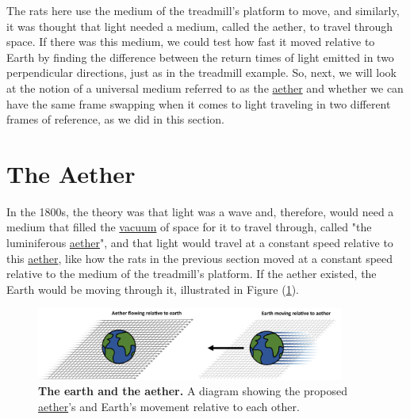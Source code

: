 The rats here use the medium of the treadmill's platform to move, and similarly, it was thought that light needed a medium, called the aether, to travel through space.
If there was this medium, we could test how fast it moved relative to Earth by finding the difference between the return times of light emitted in two perpendicular directions, just as in the treadmill example.
So, next, we will look at the notion of a universal medium referred to as the \hyperlink{def-aether}{aether} and whether we can have the same frame swapping when it comes to light traveling in two different frames of reference, as we did in this section.

\section{The Aether} \label{sect: The Aether}

In the 1800s, the theory was that light was a wave and, therefore, would need a medium that filled the \hyperlink{def-vacuum}{vacuum} of space for it to travel through, called "the luminiferous \hyperlink{def-aether}{aether}", and that light would travel at a constant speed relative to this \hyperlink{def-aether}{aether}, like how the rats in the previous section moved at a constant speed relative to the medium of the treadmill's platform.
If the aether existed, the Earth would be moving through it, illustrated in Figure (\ref{fig: Aether}).

\begin{figure}[ht]
	\centering
	\includegraphics[width = 0.9\textwidth]{images/pdf/earth_and_aether.pdf}
	\caption{\textbf{The earth and the aether.} A diagram showing the proposed \protect\hyperlink{def-aether}{aether}'s and Earth's movement relative to each other.}
	\label{fig: Aether}
\end{figure}


